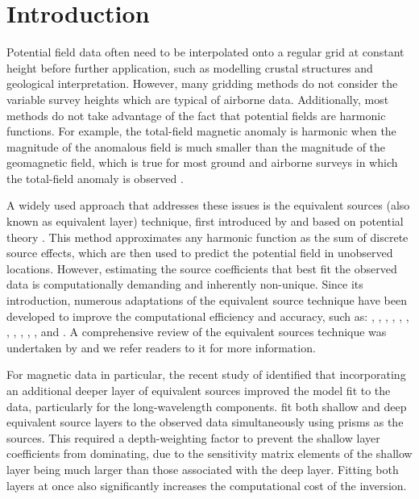 \newcommand{\norm}[1]{\lVert #1 \rVert}
\newcommand{\vecbf}[1]{\vec{\mathbf{#1}}}
\newcommand{\uvec}[1]{\hat{\mathbf{#1}}}
\newcommand{\bvec}[1]{\bar{\mathbf{#1}}}
\newcommand{\mat}[1]{\bar{\bar{\mathbf{#1}}}}


\section{Introduction}

Potential field data often need to be interpolated onto a regular grid at constant height before further application, such as modelling crustal structures and geological interpretation. However, many gridding methods do not consider the variable survey heights which are typical of airborne data. Additionally, most methods do not take advantage of the fact that potential fields are harmonic functions. For example, the total-field magnetic anomaly is harmonic when the magnitude of the anomalous field is much smaller than the magnitude of the geomagnetic field, which is true for most ground and airborne surveys in which the total-field anomaly is observed \citep{Blakley1995}.

A widely used approach that addresses these issues is the equivalent sources (also known as equivalent layer) technique, first introduced by \citet{Dampney1969} and based on potential theory \citep{Kellogg1967}. This method approximates any harmonic function as the sum of discrete source effects, which are then used to predict the potential field in unobserved locations. However, estimating the source coefficients that best fit the observed data is computationally demanding and inherently non-unique. Since its introduction, numerous adaptations of the equivalent source technique have been developed to improve the computational efficiency and accuracy, such as: \citet{Leao1989}, \citet{Cordell1992}, \citet{Mendona1994}, \citet{Guspi2009}, \citet{Li2010}, \citet{OliveiraJr2013}, \citet{Siqueira2017}, \citet{Jirigalatu2019}, \citet{Mendona2020}, \citet{Li2020}, \citet{Soler2021}, \citet{Takahashi2022} and \citet{Piauilino2024}. A comprehensive review of the equivalent sources technique was undertaken by \citet{OliveiraJr2023} and we refer readers to it for more information.

For magnetic data in particular, the recent study of \citet{Li2020} identified that incorporating an additional deeper layer of equivalent sources improved the model fit to the data, particularly for the long-wavelength components. \citet{Li2020} fit both shallow and deep equivalent source layers to the observed data simultaneously using prisms as the sources. This required a depth-weighting factor to prevent the shallow layer coefficients from dominating, due to the sensitivity matrix elements of the shallow layer being much larger than those associated with the deep layer. Fitting both layers at once also significantly increases the computational cost of the inversion.

